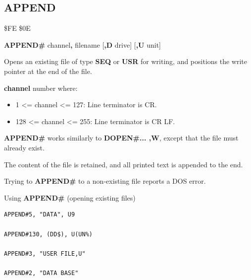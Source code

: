 
\newpage
\subsection{APPEND}
\begin{description}[leftmargin=2cm,style=nextline]
\item [Token:]    \$FE \$0E

\item [Format:]   {\bf APPEND\#} channel{\bf,} filename [{\bf,D} drive] [{\bf,U} unit]

\item [Usage:]    Opens an existing file of type {\bf SEQ} or {\bf USR} for writing, and positions the write pointer at the end of the file.

                  {\bf channel} number where:
                  \begin{itemize}
                     \item 1 <= channel <= 127: Line terminator is CR.
                     \item 128 <= channel <= 255: Line terminator is CR LF.
                  \end{itemize}

                  \filenamedefinition

                  \drivedefinition

                  \unitdefinition

\item [Remarks:]  {\bf APPEND\#} works similarly to {\bf DOPEN\#... ,W}, except that the file must already exist.

                  The content of the file is retained, and all printed text is appended to the end.

                  Trying to {\bf APPEND\#} to a non-existing file reports a DOS error.

\item [Examples:] Using {\bf APPEND\#} (opening existing files)

\begin{tcolorbox}[colback=black,coltext=white]
\verbatimfont{\codefont}
\begin{verbatim}
APPEND#5, "DATA", U9

APPEND#130, (DD$), U(UN%)

APPEND#3, "USER FILE,U"

APPEND#2, "DATA BASE"
\end{verbatim}
\end{tcolorbox}
\end{description}

